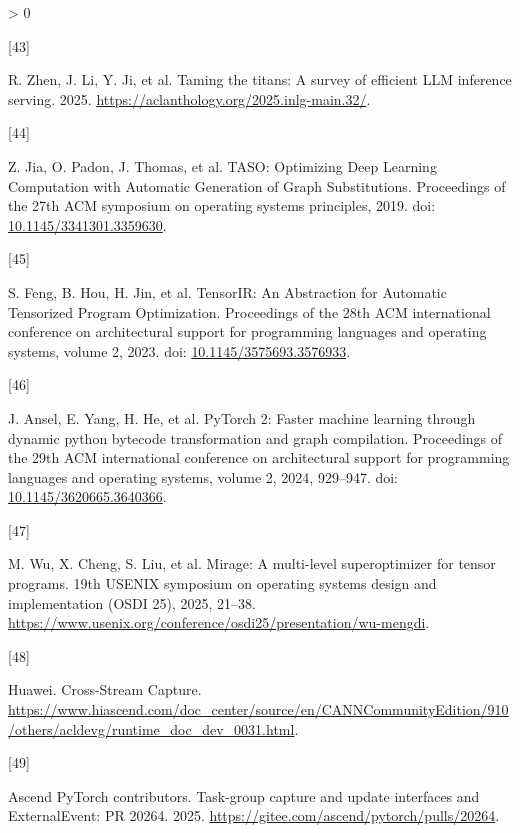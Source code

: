 \documentclass[UTF8,10.5pt,fontset=windows]{ctexart}
\newlength{\cslhangindent}
\newlength{\csllabelwidth}
\newenvironment{CSLReferences}[2] %
 {%
  \setlength{\parindent}{0pt}
  \ifodd #1 \everypar{\setlength{\hangindent}{\cslhangindent}}\ignorespaces\fi
  \ifnum #2 > 0
  \setlength{\parskip}{#2\baselineskip}
  \fi
 }%
 {}
\newcommand{\CSLLeftMargin}[1]{\parbox[t]{\csllabelwidth}{#1}}
\newcommand{\CSLRightInline}[1]{\parbox[t]{\linewidth - \csllabelwidth}{#1}\break}
\begin{document}
\begin{CSLReferences}{0}{0}
\leavevmode{}%
\CSLLeftMargin{{[}43{]} }
\CSLRightInline{R. Zhen, J. Li, Y. Ji, et al. Taming the titans: A
survey of efficient LLM inference serving. 2025.
\url{https://aclanthology.org/2025.inlg-main.32/}.}

\leavevmode{}%
\CSLLeftMargin{{[}44{]} }
\CSLRightInline{Z. Jia, O. Padon, J. Thomas, et al. {TASO: Optimizing
Deep Learning Computation with Automatic Generation of Graph
Substitutions}. Proceedings of the 27th ACM symposium on operating
systems principles, 2019. doi:
\href{https://doi.org/10.1145/3341301.3359630}{10.1145/3341301.3359630}.}

\leavevmode{}%
\CSLLeftMargin{{[}45{]} }
\CSLRightInline{S. Feng, B. Hou, H. Jin, et al. {TensorIR: An
Abstraction for Automatic Tensorized Program Optimization}. Proceedings
of the 28th ACM international conference on architectural support for
programming languages and operating systems, volume 2, 2023. doi:
\href{https://doi.org/10.1145/3575693.3576933}{10.1145/3575693.3576933}.}

\leavevmode{}%
\CSLLeftMargin{{[}46{]} }
\CSLRightInline{J. Ansel, E. Yang, H. He, et al. PyTorch 2: Faster
machine learning through dynamic python bytecode transformation and
graph compilation. Proceedings of the 29th ACM international conference
on architectural support for programming languages and operating
systems, volume 2, 2024, 929--947. doi:
\href{https://doi.org/10.1145/3620665.3640366}{10.1145/3620665.3640366}.}

\leavevmode{}%
\CSLLeftMargin{{[}47{]} }
\CSLRightInline{M. Wu, X. Cheng, S. Liu, et al. Mirage: A multi-level
superoptimizer for tensor programs. 19th USENIX symposium on operating
systems design and implementation (OSDI 25), 2025, 21--38.
\url{https://www.usenix.org/conference/osdi25/presentation/wu-mengdi}.}

\leavevmode{}%
\CSLLeftMargin{{[}48{]} }
\CSLRightInline{Huawei. {Cross-Stream Capture}.
\url{https://www.hiascend.com/doc_center/source/en/CANNCommunityEdition/910/others/acldevg/runtime_doc_dev_0031.html}.}

\leavevmode{}%
\CSLLeftMargin{{[}49{]} }
\CSLRightInline{Ascend PyTorch contributors. {Task-group capture and
update interfaces and ExternalEvent: PR 20264}. 2025.
\url{https://gitee.com/ascend/pytorch/pulls/20264}.}


\end{CSLReferences}
\end{document}

